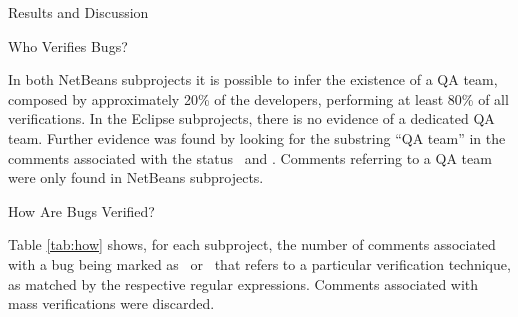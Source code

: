 \begin{section}{Results and Discussion}
\begin{subsection}{Who Verifies Bugs?}
\begin{table}
	\end{table}
		
	In both NetBeans subprojects it is possible to infer the existence of a QA team, composed by approximately 20\% of the developers, performing at least 80\% of all verifications. In the Eclipse subprojects, there is no evidence of a dedicated QA team. Further evidence was found by looking for the substring ``QA team'' in the comments associated with the status \VERIFIED\ and \REOPENED. Comments referring to a QA team were only found in NetBeans subprojects.
	
	
	
	
\end{subsection}

\begin{subsection}{How Are Bugs Verified?}


	Table \ref{tab:how} shows, for each subproject, the number of comments associated with a bug being marked as \VERIFIED\ or \REOPENED\ that refers to a particular verification technique, as matched by the respective regular expressions. Comments associated with mass verifications were discarded.
	


\end{subsection}
\end{section}
